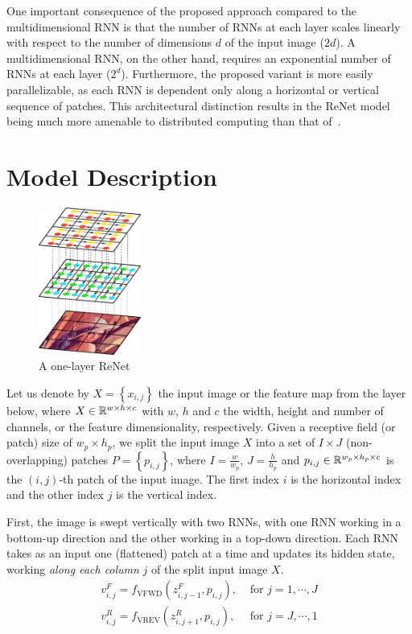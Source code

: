 One important consequence of the proposed approach compared to the
multidimensional RNN is that the number of RNNs at each layer scales linearly
with respect to the number of dimensions $d$ of the input image ($2d$). A
multidimensional RNN, on the other hand, requires an exponential number of RNNs
at each layer ($2^d$). Furthermore, the proposed variant is more easily
parallelizable, as each RNN is dependent only along a horizontal or vertical
sequence of patches. This architectural distinction results in the ReNet model
being much more amenable to distributed computing than that
of~\citet{Graves+Schmidhuber-2009}.

\vfill

\section{Model Description}\label{sec:renet_model}

\begin{figure}
    \centering
    \includegraphics[width=0.3\textwidth]{pdf/renet_first_layer.pdf}
    \caption{A one-layer ReNet}
    \label{fig:networklayer}
    \vspace{-3mm}
\end{figure}

Let us denote by $X=\left\{x_{i,j}\right\}$ the input image or the feature map
from the layer below, where $X \in \mathbb{R}^{w \times h \times c}$ with $w$, $h$ and
$c$ the width, height and number of channels, or the feature dimensionality,
respectively. Given a receptive field (or patch) size of $w_p \times h_p$, we
split the input image $X$ into a set of $I \times J$ (non-overlapping) patches
$P = \left\{ p_{i,j} \right\}$, where $I = \frac{w}{w_p}$, $J = \frac{h}{h_p}$
and $p_{i,j} \in \mathbb{R}^{w_p \times h_p \times c}$ is the $(i,j)$-th patch of the
input image. The first index $i$ is the horizontal index and the other index
$j$ is the vertical index.

First, the image is swept vertically with two RNNs, with one RNN working in
a bottom-up direction and the other working in a top-down direction.
Each RNN takes as an input one (flattened) patch at a time and updates its
hidden state, working \emph{along each column} $j$ of the split input image $X$.
\begin{align}
    v^F_{i,j} = f_{\text{VFWD}}(z^F_{i,j-1},p_{i,j}), &\text{ for
    }j=1,\cdots, J\\
    v^R_{i,j} = f_{\text{VREV}}(z^R_{i,j+1},p_{i,j}), &\text{ for
    }j=J,\cdots,1
\end{align}

